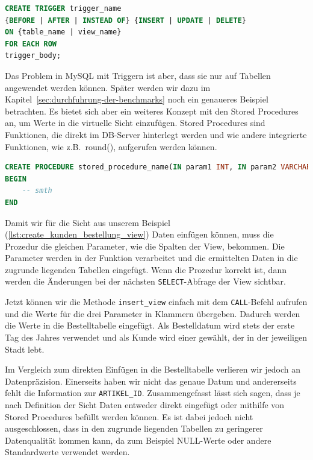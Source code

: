\vspace{-5pt}
\begin{lstlisting}[language=SQL,caption=Allgemeine Trigger Deklaration,label={lst:allg-trigger-dekl}]
CREATE TRIGGER trigger_name
{BEFORE | AFTER | INSTEAD OF} {INSERT | UPDATE | DELETE}
ON {table_name | view_name}
FOR EACH ROW
trigger_body;
\end{lstlisting}
\vspace{-5pt}

Das Problem in MySQL mit Triggern ist aber, dass sie nur auf Tabellen angewendet werden können.
Später werden wir dazu im Kapitel~\ref{sec:durchfuhrung-der-benchmarks} noch ein genaueres Beispiel betrachten.
Es bietet sich aber ein weiteres Konzept mit den Stored Procedures an, um Werte in die virtuelle Sicht einzufügen.
Stored Procedures sind Funktionen, die direkt im DB-Server hinterlegt werden und wie andere integrierte Funktionen, wie z.B.\ round(), aufgerufen werden können.

\begin{lstlisting}[language=SQL,caption=Allgemeine Prozedur Deklaration,label={lst:allg-stored-procedure-dekl}]
CREATE PROCEDURE stored_procedure_name(IN param1 INT, IN param2 VARCHAR(255))
BEGIN
    -- smth
END
\end{lstlisting}
\vspace{-5pt}

Damit wir für die Sicht aus unserem Beispiel (\ref{lst:create_kunden_bestellung_view}) Daten einfügen können, muss die Prozedur die gleichen Parameter, wie die Spalten der View, bekommen.
Die Parameter werden in der Funktion verarbeitet und die ermittelten Daten in die zugrunde liegenden Tabellen eingefügt.
Wenn die Prozedur korrekt ist, dann werden die Änderungen bei der nächsten \texttt{SELECT}-Abfrage der View sichtbar.



Jetzt können wir die Methode \texttt{insert\_view} einfach mit dem \texttt{CALL}-Befehl aufrufen und die Werte für die drei Parameter in Klammern übergeben.
Dadurch werden die Werte in die Bestelltabelle eingefügt.
Als Bestelldatum wird stets der erste Tag des Jahres verwendet und als Kunde wird einer gewählt, der in der jeweiligen Stadt lebt.

Im Vergleich zum direkten Einfügen in die Bestelltabelle verlieren wir jedoch an Datenpräzision.
Einerseits haben wir nicht das genaue Datum und andererseits fehlt die Information zur \texttt{ARTIKEL\_ID}.
Zusammengefasst lässt sich sagen, dass je nach Definition der Sicht Daten entweder direkt eingefügt oder mithilfe von Stored Procedures befüllt werden können.
Es ist dabei jedoch nicht ausgeschlossen, dass in den zugrunde liegenden Tabellen zu geringerer Datenqualität kommen kann, da zum Beispiel NULL-Werte oder andere Standardwerte verwendet werden.

